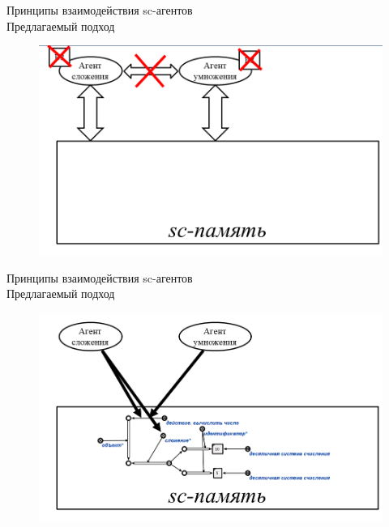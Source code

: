 \begin{frame}{Принципы взаимодействия sc-агентов\\Предлагаемый подход}
	\topline
	\justifying
	\vspace{3em}
	\begin{figure}[H]
		\includegraphics[scale=0.45]{./figures/sd_multiagent_processing/agent2.png}
	\end{figure}
\end{frame}

\begin{frame}{Принципы взаимодействия sc-агентов\\Предлагаемый подход}
	\topline
	\justifying
	\vspace{3em}
	\begin{figure}[H]
		\includegraphics[scale=0.45]{./figures/sd_multiagent_processing/agent3.png}
	\end{figure}
\end{frame}

